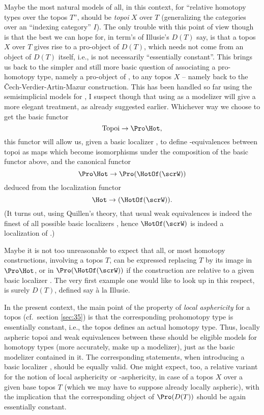 Maybe the most natural models of all, in this context, for ``relative
homotopy types over the topos $T$'', should be \emph{topoi} $X$ over
$T$ (generalizing the categories over an ``indexing category''
$I$). The only trouble with this point of view though is that the best
we can hope for, in term's of Illusie's $D(T)$ say, is that a topos
$X$ over $T$ gives rise to a pro-object of $D(T)$, which needs not
come from an object of $D(T)$ itself, i.e., is not necessarily
``essentially constant''. This brings us back to the simpler and still
more basic question of associating a pro-homotopy type, namely a
pro-object of \Hot, to any topos $X$ -- namely back to the \v
Cech-Verdier-Artin-Mazur construction. This has been handled so far
using the semisimplicial models for \Hot, I suspect though that using
\Cat{} as a modelizer will give a more elegant treatment, as already
suggested earlier. Whichever way we choose to get the basic functor
\[\mathrm{Topoi} \to \Pro\Hot,\]
this functor will allow us, given a basic localizer \scrW, to define
\scrW-equivalences between topoi as maps which become isomorphisms
under the composition of the basic functor above, and the canonical
functor
\[\Pro\Hot \to \Pro(\HotOf(\scrW))\]
deduced from the localization functor
\[\Hot\to(\HotOf(\scrW)).\]
(It turns out, using Quillen's theory, that usual weak equivalences is
indeed the finest of all possible basic localizers \scrW, hence
$\HotOf(\scrW)$ is indeed a localization of \Hot.)

Maybe it is not too unreasonable to expect that all, or most homotopy
constructions, involving a topos $T$, can be expressed replacing
$T$ by its image in $\Pro\Hot$, or in $\Pro(\HotOf(\scrW))$ if the
construction are relative to a given basic localizer \scrW. The very
first example one would like to look up in this respect,
is surely $D(T)$, defined say à la Illusie.

In the present context, the main point of the property of \emph{local
  asphericity} for a topos (cf.\ section \ref{sec:35}) is that the
corresponding prohomotopy type is essentially constant, i.e., the
topos defines an actual homotopy type. Thus, locally aspheric topoi
and weak equivalences between these should be eligible models for
homotopy types (more accurately, make up a modelizer), just as the
basic modelizer \Cat{} contained in it. The corresponding statements,
when introducing a basic localizer \scrW, should be equally valid. One
might expect, too, a relative variant for the notion of local
asphericity or \scrW-asphericity, in case of a topos $X$ over a given
base topos $T$ (which we may have to suppose already locally
aspheric), with the implication that the corresponding object of
$\Pro(D(T))$ should be again essentially constant.

